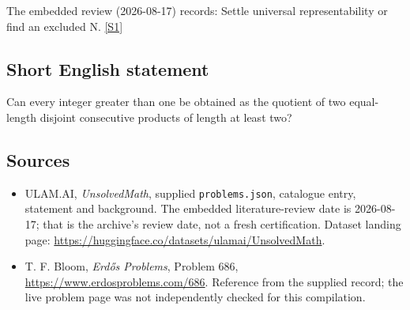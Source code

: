 \documentclass[11pt,a4paper]{article}
\newcommand{\sref}[2]{\hyperlink{source:#1:#2}{[S#2]}}
\begin{document}
The embedded review (2026-08-17) records: Settle universal representability or find an excluded N. \sref{statement}{1}

\subsection{Short English statement}

Can every integer greater than one be obtained as the quotient of two equal-length disjoint consecutive products of length at least two?

\subsection{Sources}

{\small

\begin{itemize}

\item[\hypertarget{source:statement:1}{S1}] ULAM.AI, \emph{UnsolvedMath}, supplied \texttt{problems.json}, catalogue entry, statement and background. The embedded literature-review date is 2026-08-17; that is the archive’s review date, not a fresh certification. Dataset landing page: \url{https://huggingface.co/datasets/ulamai/UnsolvedMath}.

\item[\hypertarget{source:statement:2}{S2}] T. F. Bloom, \emph{Erdős Problems}, Problem 686, \url{https://www.erdosproblems.com/686}. Reference from the supplied record; the live problem page was not independently checked for this compilation.

\end{itemize}

}

\label{end:statement}
\end{document}
